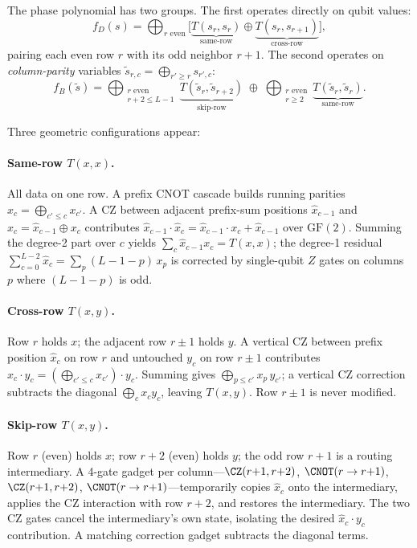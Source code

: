 The phase polynomial has two groups.
The first operates directly on qubit values:
\begin{equation}
f_D(s) = \bigoplus_{r \text{ even}} \Big[ \underbrace{T(s_r, s_r)}_{\text{same-row}} \oplus \underbrace{T(s_r, s_{r+1})}_{\text{cross-row}} \Big],
\label{eq:fD}
\end{equation}
pairing each even row $r$ with its odd neighbor $r{+}1$.
The second operates on \emph{column-parity} variables $\tilde{s}_{r,c} = \bigoplus_{r' \ge r} s_{r',c}$:
\begin{equation}
f_B(\tilde{s}) = \bigoplus_{\substack{r \text{ even} \\ r+2 \le L-1}} \underbrace{T(\tilde{s}_r, \tilde{s}_{r+2})}_{\text{skip-row}}
\;\oplus\; \bigoplus_{\substack{r \text{ even} \\ r \ge 2}} \underbrace{T(\tilde{s}_r, \tilde{s}_r)}_{\text{same-row}}.
\label{eq:fB}
\end{equation}

Three geometric configurations appear:

\paragraph{Same-row $T(x,x)$.}
All data on one row.
A prefix CNOT cascade builds running parities $\hat{x}_c = \bigoplus_{c' \le c} x_{c'}$.
A CZ between adjacent prefix-sum positions $\hat{x}_{c-1}$ and $\hat{x}_c = \hat{x}_{c-1} \oplus x_c$ contributes $\hat{x}_{c-1} \cdot \hat{x}_c = \hat{x}_{c-1} \cdot x_c + \hat{x}_{c-1}$ over $\mathrm{GF}(2)$.
Summing the degree-2 part over $c$ yields $\sum_{c} \hat{x}_{c-1} x_c = T(x,x)$; the degree-1 residual $\sum_{c=0}^{L-2} \hat{x}_c = \sum_p (L{-}1{-}p)\, x_p$ is corrected by single-qubit $Z$ gates on columns $p$ where $(L{-}1{-}p)$ is odd.

\paragraph{Cross-row $T(x,y)$.}
Row $r$ holds $x$; the adjacent row $r{\pm}1$ holds $y$.
A vertical CZ between prefix position $\hat{x}_c$ on row $r$ and untouched $y_c$ on row $r{\pm}1$ contributes $\hat{x}_c \cdot y_c = (\bigoplus_{c' \le c} x_{c'}) \cdot y_c$.
Summing gives $\bigoplus_{p \le c'} x_p\, y_{c'}$; a vertical CZ correction subtracts the diagonal $\bigoplus_c x_c y_c$, leaving $T(x,y)$.
Row $r{\pm}1$ is never modified.

\paragraph{Skip-row $T(x,y)$.}
Row $r$ (even) holds $x$; row $r{+}2$ (even) holds $y$; the odd row $r{+}1$ is a routing intermediary.
A 4-gate gadget per column---$\CZ(r{+}1, r{+}2)$, $\CNOT(r \to r{+}1)$, $\CZ(r{+}1, r{+}2)$, $\CNOT(r \to r{+}1)$---temporarily copies $\hat{x}_c$ onto the intermediary, applies the CZ interaction with row $r{+}2$, and restores the intermediary.
The two CZ gates cancel the intermediary's own state, isolating the desired $\hat{x}_c \cdot y_c$ contribution.
A matching correction gadget subtracts the diagonal terms.

